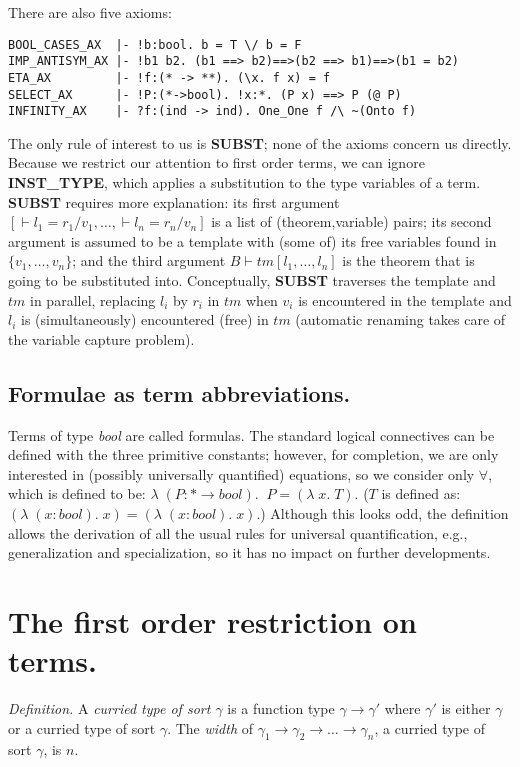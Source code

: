 There are also five axioms:
\begin{verbatim}
BOOL_CASES_AX  |- !b:bool. b = T \/ b = F
IMP_ANTISYM_AX |- !b1 b2. (b1 ==> b2)==>(b2 ==> b1)==>(b1 = b2)
ETA_AX         |- !f:(* -> **). (\x. f x) = f
SELECT_AX      |- !P:(*->bool). !x:*. (P x) ==> P (@ P)
INFINITY_AX    |- ?f:(ind -> ind). One_One f /\ ~(Onto f)
\end{verbatim}

The only rule of interest to us is {\bf SUBST}; none of the axioms concern us
directly. Because we restrict our attention to first order terms, we can ignore
{\bf INST\_TYPE}, which applies a substitution to the type variables of a term.
{\bf SUBST} requires more explanation: its first argument $[\vdash l_1=r_1/v_1,
\ldots, \vdash l_n=r_n/v_n]$ is a list of (theorem,variable) pairs; its second
argument is assumed to be a template with (some of) its free variables found in
$\{v_1, \ldots, v_n\}$; and the third argument $B \vdash tm[l_1, \ldots, l_n]$
is the theorem that is going to be substituted into. Conceptually, {\bf SUBST}
traverses the template and $tm$ in parallel, replacing $l_i$ by $r_i$ in $tm$
when $v_i$ is encountered in the template and $l_i$ is (simultaneously)
encountered (free) in $tm$ (automatic renaming takes care of the variable
capture problem).


\subsection{Formulae as term abbreviations.}

Terms of type {\em bool} are called formulas. The standard logical connectives
can be defined with the three primitive constants; however, for completion, we
are only interested in (possibly universally quantified) equations, so we
consider only $\forall$, which is defined to be: $\lambda\;(P:* \rightarrow
bool).\;\;P = (\lambda\;x.\;T)$. ($T$ is defined as: $(\lambda\;(x:bool).\;x) =
(\lambda\;(x:bool).\;x)$.) Although this looks odd, the definition allows the
derivation of all the usual rules for universal quantification, e.g.,
generalization and specialization, so it has no impact on further developments.


\section{The first order restriction on terms.}

{\em Definition.} A {\em curried type of sort $\gamma$} is a function type
$\gamma \rightarrow \gamma'$ where $\gamma'$ is either $\gamma$ or a curried
type of sort $\gamma$. The {\em width} of $\gamma_1 \rightarrow \gamma_2
\rightarrow \ldots \rightarrow \gamma_n$, a curried type of sort $\gamma$, is
$n$.

